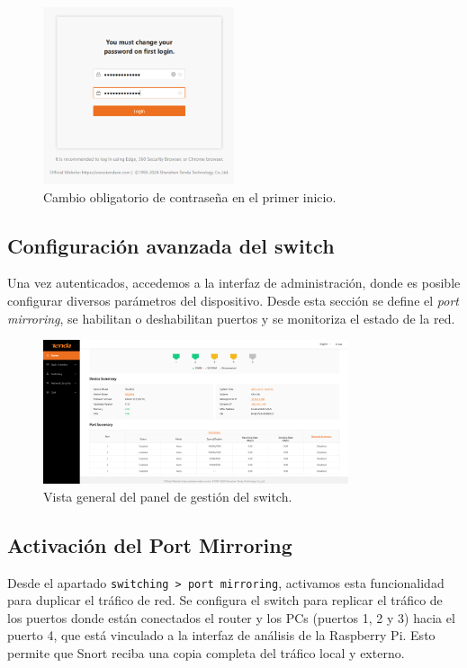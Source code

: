 \documentclass[11pt,a4paper,twoside]{report}
\begin{document}
\begin{figure}[H]
	\centering
	\includegraphics[width=0.5\textwidth]{pruebas_config/6-cambio_pass_tenda.png}
	\caption{Cambio obligatorio de contraseña en el primer inicio.}
\end{figure}

\subsection*{Configuración avanzada del switch}

Una vez autenticados, accedemos a la interfaz de administración, donde es posible configurar diversos parámetros del dispositivo. Desde esta sección se define el \textit{port mirroring}, se habilitan o deshabilitan puertos y se monitoriza el estado de la red.

\begin{figure}[H]
	\centering
	\includegraphics[width=0.8\textwidth]{pruebas_config/7-pagina_tenda.png}
	\caption{Vista general del panel de gestión del switch.}
\end{figure}

\subsection*{Activación del Port Mirroring}

Desde el apartado \texttt{switching > port mirroring}, activamos esta funcionalidad para duplicar el tráfico de red. Se configura el switch para replicar el tráfico de los puertos donde están conectados el router y los PCs (puertos 1, 2 y 3) hacia el puerto 4, que está vinculado a la interfaz de análisis de la Raspberry Pi. Esto permite que Snort reciba una copia completa del tráfico local y externo.
\end{document}

